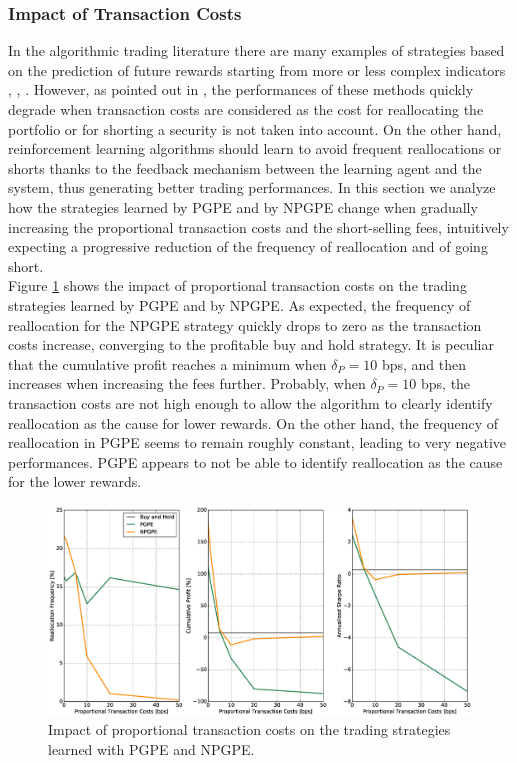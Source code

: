 \subsubsection{Impact of Transaction Costs}
In the algorithmic trading literature there are many examples of strategies based on the prediction of future rewards starting from more or less complex indicators \cite{kamijo1990stock}, \cite{saad1998comparative}, \cite{liang2011stock}. However, as pointed out in \cite{deng2016deep}, the performances of these methods quickly degrade when transaction costs are considered as the cost for reallocating the portfolio or for shorting a security is not taken into account. On the other hand, reinforcement learning algorithms should learn to avoid frequent reallocations or shorts thanks to the feedback mechanism between the learning agent and the system, thus generating better trading performances. In this section we analyze how the strategies learned by PGPE and by NPGPE change when gradually increasing the proportional transaction costs and the short-selling fees, intuitively expecting a progressive reduction of the frequency of reallocation and of going short.\\
Figure \ref{fig:impact_transaction_costs} shows the impact of proportional transaction costs on the trading strategies learned by PGPE and by NPGPE. As expected, the frequency of reallocation for the NPGPE strategy quickly drops to zero as the transaction costs increase, converging to the profitable buy and hold strategy. It is peculiar that the cumulative profit reaches a minimum when $\delta_P = 10$ bps, and then increases when increasing the fees further. Probably, when $\delta_P = 10$ bps, the transaction costs are not high enough to allow the algorithm to clearly identify reallocation as the cause for lower rewards. On the other hand, the frequency of reallocation in PGPE seems to remain roughly constant, leading to very negative performances. PGPE appears to not be able to identify reallocation as the cause for the lower rewards.\\

\begin{figure}[t!]
	\centering
	\includegraphics[width=1.0\textwidth]{Images/6_4_impact_transaction_costs}
	\caption[Impact of proportional transaction costs]{Impact of proportional transaction costs on the trading strategies learned with PGPE and NPGPE.}
	\label{fig:impact_transaction_costs}
\end{figure}

